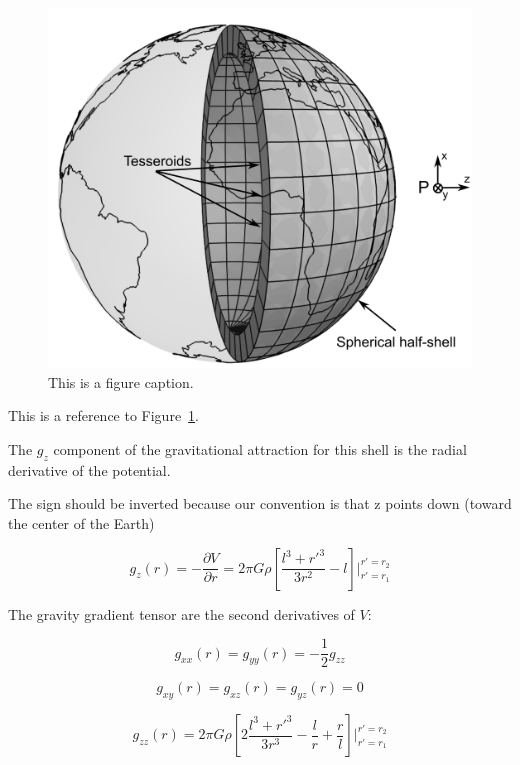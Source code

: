 \documentclass[paper,twocolumn,twoside]{geophysics}
\begin{document}
\begin{figure}
    \centering
    \includegraphics[width=\columnwidth]{figs/spherical-shell}
    \caption{This is a figure caption.}
    \label{fig:shell}
\end{figure}

This is a reference to Figure~\ref{fig:shell}.

The $g_z$ component of the gravitational attraction for this shell is the
radial derivative of the potential.

The sign should be inverted because our convention is that z points down
(toward the center of the Earth)

\begin{equation}
    g_z(r) = -\dfrac{\partial V}{\partial r} = 2\pi G \rho \left[ \dfrac{l^3 +
            {r'}^3}{3r^2} - l \right] \Biggr \rvert_{r'=r_1}^{r'=r_2}
    \label{eq:halfshell-gz}
\end{equation}

The gravity gradient tensor are the second derivatives of $V$:

\begin{equation}
    g_{xx}(r) = g_{yy}(r) = -\dfrac{1}{2} g_{zz}
\end{equation}

\begin{equation}
    g_{xy}(r) = g_{xz}(r) = g_{yz}(r) = 0
\end{equation}

\begin{equation}
    g_{zz}(r) = 2\pi G \rho \left[ 2\dfrac{l^3 + {r'}^3}{3r^3} - \dfrac{l}{r} +
    \dfrac{r}{l} \right] \Biggr \rvert_{r'=r_1}^{r'=r_2}
\end{equation}
\end{document}
